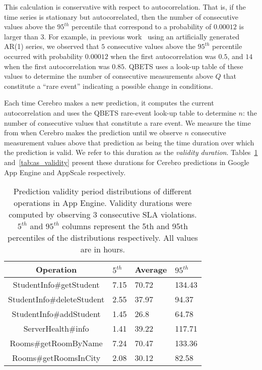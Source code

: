 This calculation is conservative with respect to autocorrelation. That is, if
the time series is stationary but autocorrelated, then the number of consecutive 
values above the $95^{th}$ percentile that correspond to a probability of
$0.00012$ is larger than $3$.  For example, in previous
work~\cite{Nurmi:2007:QQB:1791551.1791556}
using an artificially generated AR(1) series, 
we observed that $5$ consecutive values above the $95^{th}$ percentile
occurred with probability $0.00012$ when the first autocorrelation was $0.5$,
and $14$ when the first autocorrelation was $0.85$.  QBETS uses a look-up
table of these values to
determine the number of consecutive measurements above
$Q$ that constitute a ``rare event'' 
indicating a possible change in
conditions.

Each time Cerebro makes a new prediction, it computes the current
autocorrelation and uses the QBETS rare-event look-up table to determine $n$:
the number of
consecutive values that constitute a rare event.
We 
measure the time from when
Cerebro makes the prediction until we observe $n$ 
consecutive measurement values above that prediction 
as being the time duration over which
the prediction is valid. We refer to this duration as the \textit{validity duration}.  
Tables~\ref{tab:gae_validity} and~\ref{tab:as_validity} present these durations
for Cerebro predictions in Google App Engine and AppScale
respectively.

\begin{table}
\caption{Prediction validity period distributions of different operations in
App Engine. Validity durations were computed by observing $3$ consecutive SLA
violations. $5^{th}$ and $95^{th}$ columns represent the 5th and 95th 
percentiles of the
distributions respectively. All values are in hours.
\label{tab:gae_validity}
}
\begin{center}
\begin{tabular}{|c|p{1cm}|p{1cm}|p{1cm}|}
\hline
Operation & $5^{th}$ & Average & $95^{th}$ \\ \hline
StudentInfo\#getStudent & 7.15 & 70.72 & 134.43 \\ \hline
StudentInfo\#deleteStudent & 2.55 & 37.97 & 94.37 \\ \hline
StudentInfo\#addStudent & 1.45 & 26.8 & 64.78 \\ \hline
ServerHealth\#info & 1.41 & 39.22 & 117.71 \\ \hline
Rooms\#getRoomByName & 7.24 & 70.47 & 133.36 \\ \hline
Rooms\#getRoomsInCity & 2.08 & 30.12 & 82.58 \\ \hline
\end{tabular}
\end{center}
\vspace{-0.1in}
\end{table}

